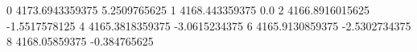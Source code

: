 0 4173.6943359375 5.2509765625
1 4168.443359375 0.0
2 4166.8916015625 -1.5517578125
4 4165.3818359375 -3.0615234375
6 4165.9130859375 -2.5302734375
8 4168.05859375 -0.384765625
